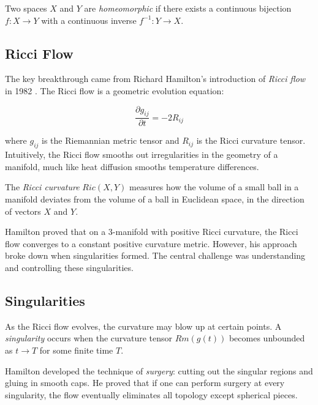 \begin{definition}[Homeomorphic]
Two spaces $X$ and $Y$ are \emph{homeomorphic} if there exists a continuous bijection $f: X \to Y$ with a continuous inverse $f^{-1}: Y \to X$.
\end{definition}

\subsection{Ricci Flow}

The key breakthrough came from Richard Hamilton's introduction of \emph{Ricci flow} in 1982 \cite{hamilton1982}. The Ricci flow is a geometric evolution equation:

\begin{equation}
\frac{\partial g_{ij}}{\partial t} = -2R_{ij}
\end{equation}

where $g_{ij}$ is the Riemannian metric tensor and $R_{ij}$ is the Ricci curvature tensor. Intuitively, the Ricci flow smooths out irregularities in the geometry of a manifold, much like heat diffusion smooths temperature differences.

\begin{definition}
The \emph{Ricci curvature} $Ric(X,Y)$ measures how the volume of a small ball in a manifold deviates from the volume of a ball in Euclidean space, in the direction of vectors $X$ and $Y$.
\end{definition}

Hamilton proved that on a 3-manifold with positive Ricci curvature, the Ricci flow converges to a constant positive curvature metric. However, his approach broke down when singularities formed. The central challenge was understanding and controlling these singularities.

\subsection{Singularities}

As the Ricci flow evolves, the curvature may blow up at certain points. A \emph{singularity} occurs when the curvature tensor $Rm(g(t))$ becomes unbounded as $t \to T$ for some finite time $T$.

Hamilton developed the technique of \emph{surgery}: cutting out the singular regions and gluing in smooth caps. He proved that if one can perform surgery at every singularity, the flow eventually eliminates all topology except spherical pieces.

